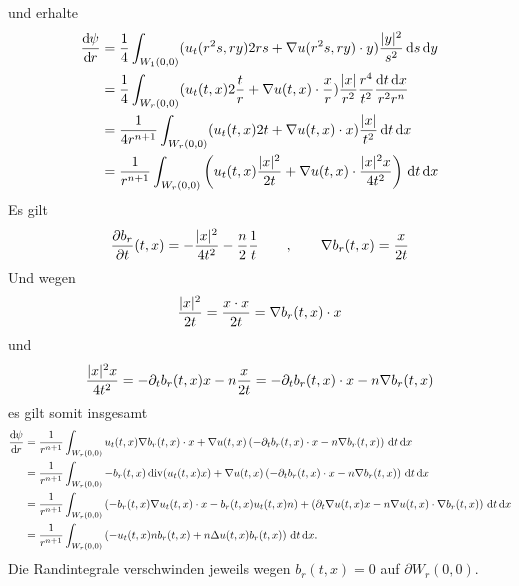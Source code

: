 \begin{beweis}
\begin{enumerate}[(i)]
		und erhalte
		\begin{align*}
			\frac{\mathrm{d}\mkern-1.0mu \psi}{\mathrm{d}\mkern-1.0mu r}  &= \frac{1}{4} \int_{W_1(0,0)}^{} ( u_t(r^2s,ry)2rs +  \nabla u(r^2s,ry) \cdot y) \frac{\lvert y\rvert^2}{s^2} \,\mathrm{d}s \,\mathrm{d}y \\
			&= \frac{1}{4} \int_{W_r(0,0)}^{} (u_t(t,x)2 \frac{t}{r} + 
			\nabla u(t,x) \cdot \frac{x}{r}) \frac{\lvert x\rvert}{r^2} \frac{r^4}{t^2} \frac{\mathrm{d}t \, \mathrm{d}x}{r^2r^n}  \\
			&= \frac{1}{4r^{n+1}} \int_{W_r(0,0)}^{} ( u_t(t,x)2t +  \nabla u(t,x) \cdot x) \frac{\lvert x\rvert}{t^2} \,\mathrm{d}t \,\mathrm{d}x \\
			&= \frac{1}{r^{n+1}} \int_{W_r(0,0)}^{} \left( u_t(t,x) \frac{\lvert x\rvert^2}{2t}
			+  \nabla u(t,x) \cdot \frac{\lvert x\rvert^2 x}{4t^2} \right) \,\mathrm{d}t  \, \mathrm{d}x
		\end{align*}
		Es gilt
		\begin{align*}
			\frac{{\partial b_r}}{{\partial t}} (t,x) = - \frac{\lvert x\rvert^2}{4t^2} - \frac{n}{2} \frac{1}{t} \qquad , \qquad  \nabla b_r(t,x) = \frac{x}{2t}
		\end{align*}
		Und wegen \[
			\frac{\lvert x\rvert^2}{2t} = \frac{x \cdot x}{2t} =  \nabla b_r(t,x) \cdot x
		\]
		und 
		\[
			\frac{\lvert x\rvert^2 x}{4t^2} = - \partial_tb_r(t,x)x -n \frac{x}{2t} = - \partial_t b_r(t,x) \cdot x - n  \nabla b_r(t,x)
		\]
		es gilt somit insgesamt 
		\begin{align*}
			\frac{\mathrm{d}\mkern-1.0mu \psi}{\mathrm{d}\mkern-1.0mu r}  &= \frac{1}{r^{n+1}} \int_{W_r(0,0)}^{} u_t(t,x)  \nabla b_r(t,x) \cdot x 
			+  \nabla u(t,x) \left( - \partial_t b_r(t,x) \cdot x - n  \nabla b_r(t,x) \right) \,\mathrm{d}t \,\mathrm{d}x \\
			&= \frac{1}{r^{n+1}} \int_{W_r(0,0)}^{}- b_r(t,x) \operatorname{div}(u_t(t,x)x) 
			+  \nabla u(t,x) \left( - \partial_t b_r(t,x) \cdot x - n  \nabla b_r(t,x) \right) \,\mathrm{d}t \,\mathrm{d}x \\
			&= \frac{1}{r^{n+1}} \int_{W_r(0,0)}^{} \left( -b_r(t,x)  \nabla u_t(t,x) \cdot x - b_r(t,x)u_t(t,x)n \right)
			+ \left( \partial_t  \nabla u(t,x) x - n  \nabla u(t,x) \cdot  \nabla b_r(t,x) \right) \,\mathrm{d}t \,\mathrm{d}x \\
			&= \frac{1}{r^{n+1}} \int_{W_r(0,0)}^{} \left( - u_t(t,x)n b_r(t,x) + n \Delta u(t,x) b_r(t,x) \right) \,\mathrm{d}t \,\mathrm{d}x.
		\end{align*}
		Die Randintegrale verschwinden jeweils wegen $b_r(t,x) = 0$ auf $\partial W_r(0,0)$.
		
	\end{enumerate}
\end{beweis}